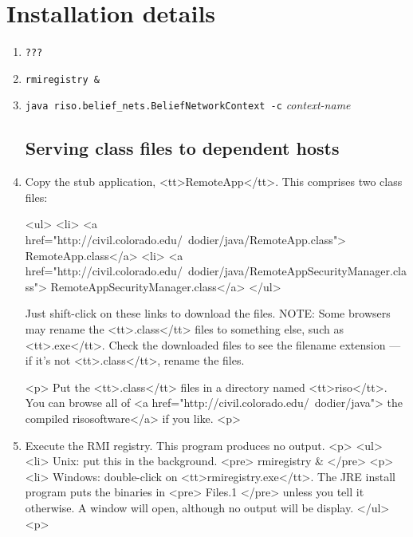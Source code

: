 \documentclass[12pt]{article}
\newcommand{\RISO}{{\sc riso}}
\begin{document}
\section{Installation details}

\begin{enumerate}

It is assumed that there is a Java Runtime Environment (JRE) running on each \RISO host.
The code has been tested with IBM's implementation of JRE 1.3.0 for Linux;
\RISO should work equally well on other platforms.
Note that JRE versions 1.1.x use a different RMI implementation than 1.2.x and later.

\subsection{Isolated host or multiple independent hosts}

\item {\tt ???}
\item {\tt rmiregistry \&}

\item {\tt java riso.belief\_nets.BeliefNetworkContext -c} {\it context-name}

\subsection{Serving class files to dependent hosts}

\item Copy the stub application, <tt>RemoteApp</tt>. This comprises two class files:

	<ul>
	<li> <a href="http://civil.colorado.edu/~dodier/java/RemoteApp.class">
		RemoteApp.class</a>
	<li> <a href="http://civil.colorado.edu/~dodier/java/RemoteAppSecurityManager.class">
		RemoteAppSecurityManager.class</a>
	</ul>

	Just shift-click on these links to download the files.
	NOTE: Some browsers may rename the <tt>.class</tt> files to something else,
	such as <tt>.exe</tt>. Check the downloaded files to see the filename extension ---
	if it's not <tt>.class</tt>, rename the files.

	<p> Put the <tt>.class</tt> files in a directory named <tt>\RISO</tt>.
	You can browse all of <a href="http://civil.colorado.edu/~dodier/java">
	the compiled \RISO software</a> if you like.
	<p>

\item Execute the RMI registry. This program produces no output.
	<p>
	<ul>
	<li> Unix: put this in the background.
<pre>
rmiregistry &
</pre>
	<p>
	<li> Windows: double-click on <tt>rmiregistry.exe</tt>.
	The JRE install program puts the binaries in 
<pre>
\Program Files\JavaSoft\JRE\1.1\bin
</pre>
	unless you tell it otherwise.
	A window will open, 
		although no output will be display.
	</ul>
	<p>


\end{enumerate}
\end{document}
